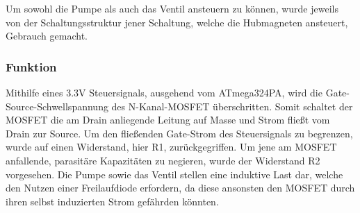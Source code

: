 Um sowohl die Pumpe als auch das Ventil ansteuern zu können, wurde jeweils von der Schaltungsstruktur jener Schaltung, welche die Hubmagneten ansteuert, Gebrauch gemacht.

\subsubsection{Funktion}

Mithilfe eines 3.3V Steuersignals, ausgehend vom ATmega324PA, wird die Gate-Source-Schwellspannung des N-Kanal-MOSFET überschritten.
Somit schaltet der MOSFET die am Drain anliegende Leitung auf Masse und Strom fließt vom Drain zur Source.
Um den fließenden Gate-Strom des Steuersignals zu begrenzen, wurde auf einen Widerstand, hier R1, zurückgegriffen.
Um jene am MOSFET anfallende, parasitäre Kapazitäten zu negieren, wurde der Widerstand R2 vorgesehen.
Die Pumpe sowie das Ventil stellen eine induktive Last dar, welche den Nutzen einer Freilaufdiode erfordern, da diese ansonsten den MOSFET durch ihren selbst induzierten Strom gefährden könnten.

